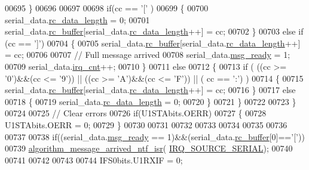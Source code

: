 \begin{DoxyCode}
{{{{{{00695         \}
00696 
00697    
00698         \textcolor{keywordflow}{if}(cc == \textcolor{charliteral}{'['} )
00699         \{
00700             serial\_data.\hyperlink{a00030_ab136d4fef2c523afd55b6ca74c46d7cc}{rc\_data\_length} = 0;
00701             serial\_data.\hyperlink{a00030_ac734cb8be27f86bd99edc539434883a4}{rc\_buffer}[serial\_data.\hyperlink{a00030_ab136d4fef2c523afd55b6ca74c46d7cc}{rc\_data\_length}++] = cc;
00702         \}
00703         \textcolor{keywordflow}{else} \textcolor{keywordflow}{if} (cc == \textcolor{charliteral}{']'})
00704         \{
00705             serial\_data.\hyperlink{a00030_ac734cb8be27f86bd99edc539434883a4}{rc\_buffer}[serial\_data.\hyperlink{a00030_ab136d4fef2c523afd55b6ca74c46d7cc}{rc\_data\_length}++] = cc;
00706 
00707             \textcolor{comment}{// Full message arrived}
00708             serial\_data.\hyperlink{a00030_ac0789a6c9ab7ccd13d6f04ae31496854}{msg\_ready} = 1;
00709             serial\_data.\hyperlink{a00030_a15d632931355763426453b626cab774b}{irq\_cnt}++;
00710         \}
00711         \textcolor{keywordflow}{else}
00712         \{        
00713             \textcolor{keywordflow}{if} ( ((cc >= \textcolor{charliteral}{'0'})&&(cc <= \textcolor{charliteral}{'9'})) || ((cc >= \textcolor{charliteral}{'A'})&&(cc <= \textcolor{charliteral}{'F'})) || ( cc == \textcolor{charliteral}{':'}) )
00714             \{
00715                 serial\_data.\hyperlink{a00030_ac734cb8be27f86bd99edc539434883a4}{rc\_buffer}[serial\_data.\hyperlink{a00030_ab136d4fef2c523afd55b6ca74c46d7cc}{rc\_data\_length}++] = cc;
00716             \}
00717             \textcolor{keywordflow}{else}
00718             \{
00719                 serial\_data.\hyperlink{a00030_ab136d4fef2c523afd55b6ca74c46d7cc}{rc\_data\_length} = 0;
00720             \}                          
00721         \}
00722     
00723     \}
00724     
00725     \textcolor{comment}{// Clear errors}
00726     \textcolor{keywordflow}{if}(U1STAbits.OERR)
00727     \{
00728         U1STAbits.OERR = 0;
00729     \}
00730          
00731 
00732 
00733 
00734 
00735 
00736 
00737 
00738     \textcolor{keywordflow}{if}((serial\_data.\hyperlink{a00030_ac0789a6c9ab7ccd13d6f04ae31496854}{msg\_ready} == 1)&&(serial\_data.\hyperlink{a00030_ac734cb8be27f86bd99edc539434883a4}{rc\_buffer}[0]==\textcolor{charliteral}{'['}))
00739          \hyperlink{a00021_a85471d58eae93d5d7e7e2b52e2b915d3}{algorithm\_message\_arrived\_ntf\_isr}(
      \hyperlink{a00021_a286de80383de54438b3e38d9f149dfd0}{IRQ\_SOURCE\_SERIAL});
00740            
00741   
00742  
00743     
00744     IFS0bits.U1RXIF = 0;  
}}}}}}
\end{DoxyCode}

